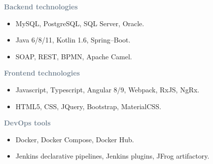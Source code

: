 



\textcolor{SlateGrey}{\textbf{Backend technologies}}
\newline

\begin{itemize}
    \item MySQL, PostgreSQL, SQL Server, Oracle.
    \item Java 6/8/11, Kotlin 1.6, Spring--Boot.
    \item SOAP, REST, BPMN, Apache Camel.
\end{itemize}

\textcolor{SlateGrey}{\textbf{Frontend technologies}}
\newline

\begin{itemize}
    \item Javascript, Typescript, Angular 8/9, Webpack, RxJS, NgRx.
    \item HTML5, CSS, JQuery, Bootstrap, MaterialCSS.
\end{itemize}

\textcolor{SlateGrey}{\textbf{DevOps tools}}
\newline

\begin{itemize}
    \item Docker, Docker Compose, Docker Hub.
    \item Jenkins declarative pipelines, Jenkins plugins, JFrog artifactory.
\end{itemize}




